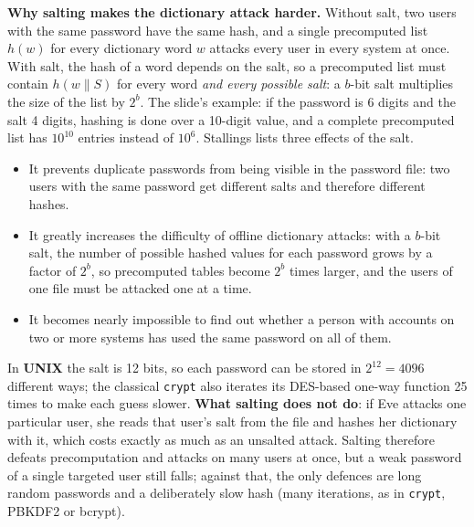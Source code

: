 \textbf{Why salting makes the dictionary attack harder.} Without salt, two users with the same password have the same hash, and a single precomputed list $h(w)$ for every dictionary word $w$ attacks every user in every system at once. With salt, the hash of a word depends on the salt, so a precomputed list must contain $h(w \| S)$ for every word \emph{and every possible salt}: a $b$-bit salt multiplies the size of the list by $2^b$. The slide's example: if the password is 6 digits and the salt 4 digits, hashing is done over a 10-digit value, and a complete precomputed list has $10^{10}$ entries instead of $10^6$. Stallings lists three effects of the salt.
\begin{itemize}
  \item It prevents duplicate passwords from being visible in the password file: two users with the same password get different salts and therefore different hashes.
  \item It greatly increases the difficulty of offline dictionary attacks: with a $b$-bit salt, the number of possible hashed values for each password grows by a factor of $2^b$, so precomputed tables become $2^b$ times larger, and the users of one file must be attacked one at a time.
  \item It becomes nearly impossible to find out whether a person with accounts on two or more systems has used the same password on all of them.
\end{itemize}
In \textbf{UNIX} the salt is 12 bits, so each password can be stored in $2^{12} = 4096$ different ways; the classical \texttt{crypt} also iterates its DES-based one-way function 25 times to make each guess slower. \textbf{What salting does not do}: if Eve attacks one particular user, she reads that user's salt from the file and hashes her dictionary with it, which costs exactly as much as an unsalted attack. Salting therefore defeats precomputation and attacks on many users at once, but a weak password of a single targeted user still falls; against that, the only defences are long random passwords and a deliberately slow hash (many iterations, as in \texttt{crypt}, PBKDF2 or bcrypt).

